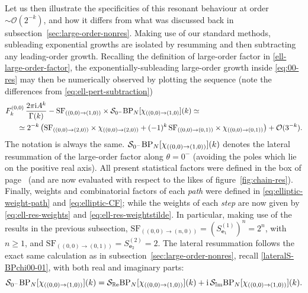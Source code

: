 \documentclass[11pt,a4paper]{article}
\newcommand{\CS}{{\cal S}}
\newcommand{\be}{\begin{equation}}
\newcommand{\ee}{\end{equation}}
\def\im{{\mathbb{I}}{\mathrm{m}}}
\def\re{{\mathbb{R}}{\mathrm{e}}}
\newcommand{\rmi}{{\mathrm{i}}}
\begin{document}
Let us then illustrate the specificities of this resonant behaviour at order $\sim \mathcal{O}(2^{-k})$, and how it differs from what was discussed back in subsection~\ref{sec:large-order-nonres}. Making use of our standard methods, subleading exponential growths are isolated by resumming and then subtracting any leading-order growth. Recalling the definition of large-order factor in \eqref{ell-large-order-factor}, the exponentially-subleading large-order growth inside \eqref{eq:00-res} may then be numerically observed by plotting the sequence (note the differences from \eqref{eq:ell-pert-subtraction})
%
\begin{eqnarray}
F_k^{(0,0)}\, \frac{2\pi\mathrm{i} A^{k}}{\Gamma(k)} - \mathrm{SF}_{( (0,0) \rightarrow (1,0) )} \times \mathcal{S}_{0^{-}} \mathrm{BP}_N [\chi_{( (0,0) \rightarrow (1,0)}] (k) &\simeq& \\
&&
\hspace{-250pt}
\simeq 2^{-k} \left( \mathrm{SF}_{( (0,0) \rightarrow (2,0) )} \times \chi_{( (0,0) \rightarrow  (2,0) )} + (-1)^k\, \mathrm{SF}_{( (0,0) \rightarrow (0,1) )} \times \chi_{( (0,0) \rightarrow (0,1)) } \right) + \mathcal{O}(3^{-k}). \nonumber
\end{eqnarray}
%
\noindent
The notation is always the same. $\CS_{0^-} \mathrm{BP}_N [\chi_{( (0,0) \rightarrow (1,0) )}] (k)$ denotes the lateral resummation of the large-order factor along $\theta = 0^-$ (avoiding the poles which lie on the positive real axis). All present statistical factors were defined in the box of page~\pageref{ell-stat-fact} (and are now evaluated with respect to the likes of figure~\ref{fig:chain-res}). Finally, weights and combinatorial factors of each \textit{path} were defined in \eqref{eq:elliptic-weight-path} and \eqref{eq:elliptic-CF}; while the weights of each \textit{step} are now given by \eqref{eq:ell-res-weights} and \eqref{eq:ell-res-weightstilde}. In particular, making use of the results in the previous subsection, $\mathrm{SF}_{( (0,0) \rightarrow (n,0) )} = \left( S^{(1)}_{\boldsymbol{e}_1} \right)^n = 2^n$, with $n\ge1$, and $\mathrm{SF}_{( (0,0) \rightarrow (0,1) )} = S^{(2)}_{\boldsymbol{e}_2} = 2$. The lateral resummation follows the exact same calculation as in subsection~\ref{sec:large-order-nonres}, recall \eqref{lateralS-BPchi00-01}, with both real and imaginary parts:
%
\be
\CS_{0^{-}} \mathrm{BP}_{N} [\chi_{( (0,0) \rightarrow (1,0) )}] (k) = \CS_{\re} \mathrm{BP}_{N} [\chi_{( (0,0) \rightarrow (1,0) )}] (k) + \rmi\, \CS_{\im} \mathrm{BP}_{N} [\chi_{( (0,0) \rightarrow (1,0) )}] (k).
\ee
%
\end{document}
